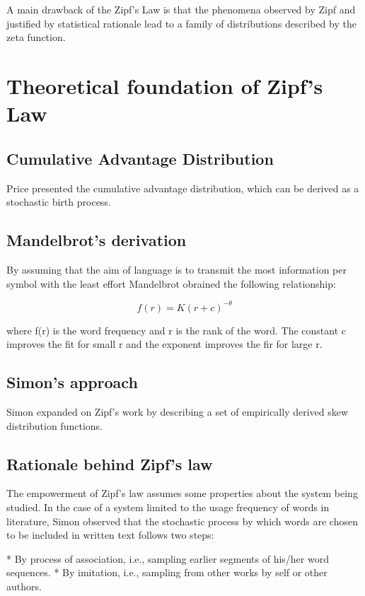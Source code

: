\documentclass{article}
\begin{document}
A main drawback of the Zipf's Law is that the phenomena observed by
Zipf and justified by statistical rationale lead to a family of
distributions described by the zeta function.

\section{Theoretical foundation of Zipf's Law}
\subsection{Cumulative Advantage Distribution}

Price presented the cumulative advantage distribution, which can be
derived as a stochastic birth process.

\subsection{Mandelbrot's derivation}

By assuming that the aim of language is to transmit the most
information per symbol with the least effort Mandelbrot obrained the
following relationship:

\begin{equation}
  \label{simple_equation}
  f(r) = K(r+c)^{-\theta}
\end{equation}

where f(r) is the word frequency and r is the rank of the word. The
constant c improves the fit for small r and the exponent improves the
fir for large r.

\subsection{Simon's approach}

Simon expanded on Zipf's work by describing a set of empirically
derived skew distribution functions.

\subsection{Rationale behind Zipf's law}

The empowerment of Zipf's law assumes some properties about the
system being studied. In the case of a system limited to the usage
frequency of words in literature, Simon observed that the stochastic
process by which words are chosen to be included in written text
follows two steps:

* By process of association, i.e., sampling earlier segments of
his/her word sequences.
* By imitation, i.e., sampling from other works by self or other authors.
\end{document}
